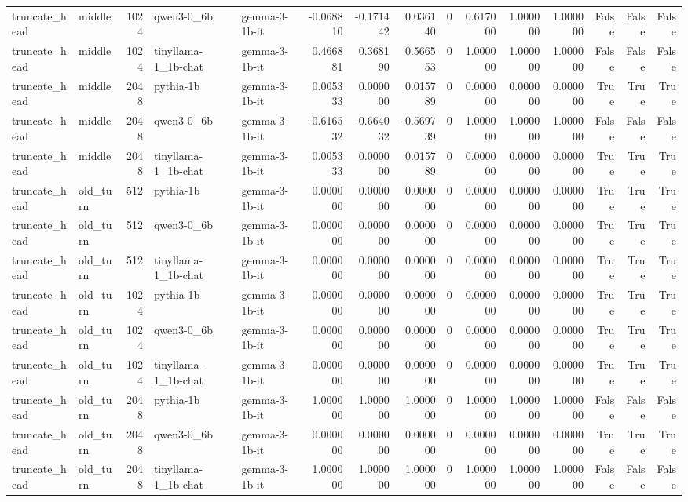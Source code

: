 \begin{tabular}{llrllrrrrrrrrrr}
truncate_head & middle & 1024 & qwen3-0_6b & gemma-3-1b-it & -0.068810 & -0.171442 & 0.036140 & 0 & 0.617000 & 1.000000 & 1.000000 & False & False & False \\
truncate_head & middle & 1024 & tinyllama-1_1b-chat & gemma-3-1b-it & 0.466881 & 0.368190 & 0.566553 & 0 & 1.000000 & 1.000000 & 1.000000 & False & False & False \\
truncate_head & middle & 2048 & pythia-1b & gemma-3-1b-it & 0.005333 & 0.000000 & 0.015789 & 0 & 0.000000 & 0.000000 & 0.000000 & True & True & True \\
truncate_head & middle & 2048 & qwen3-0_6b & gemma-3-1b-it & -0.616532 & -0.664032 & -0.569739 & 0 & 1.000000 & 1.000000 & 1.000000 & False & False & False \\
truncate_head & middle & 2048 & tinyllama-1_1b-chat & gemma-3-1b-it & 0.005333 & 0.000000 & 0.015789 & 0 & 0.000000 & 0.000000 & 0.000000 & True & True & True \\
truncate_head & old_turn & 512 & pythia-1b & gemma-3-1b-it & 0.000000 & 0.000000 & 0.000000 & 0 & 0.000000 & 0.000000 & 0.000000 & True & True & True \\
truncate_head & old_turn & 512 & qwen3-0_6b & gemma-3-1b-it & 0.000000 & 0.000000 & 0.000000 & 0 & 0.000000 & 0.000000 & 0.000000 & True & True & True \\
truncate_head & old_turn & 512 & tinyllama-1_1b-chat & gemma-3-1b-it & 0.000000 & 0.000000 & 0.000000 & 0 & 0.000000 & 0.000000 & 0.000000 & True & True & True \\
truncate_head & old_turn & 1024 & pythia-1b & gemma-3-1b-it & 0.000000 & 0.000000 & 0.000000 & 0 & 0.000000 & 0.000000 & 0.000000 & True & True & True \\
truncate_head & old_turn & 1024 & qwen3-0_6b & gemma-3-1b-it & 0.000000 & 0.000000 & 0.000000 & 0 & 0.000000 & 0.000000 & 0.000000 & True & True & True \\
truncate_head & old_turn & 1024 & tinyllama-1_1b-chat & gemma-3-1b-it & 0.000000 & 0.000000 & 0.000000 & 0 & 0.000000 & 0.000000 & 0.000000 & True & True & True \\
truncate_head & old_turn & 2048 & pythia-1b & gemma-3-1b-it & 1.000000 & 1.000000 & 1.000000 & 0 & 1.000000 & 1.000000 & 1.000000 & False & False & False \\
truncate_head & old_turn & 2048 & qwen3-0_6b & gemma-3-1b-it & 0.000000 & 0.000000 & 0.000000 & 0 & 0.000000 & 0.000000 & 0.000000 & True & True & True \\
truncate_head & old_turn & 2048 & tinyllama-1_1b-chat & gemma-3-1b-it & 1.000000 & 1.000000 & 1.000000 & 0 & 1.000000 & 1.000000 & 1.000000 & False & False & False \\

\end{tabular}
